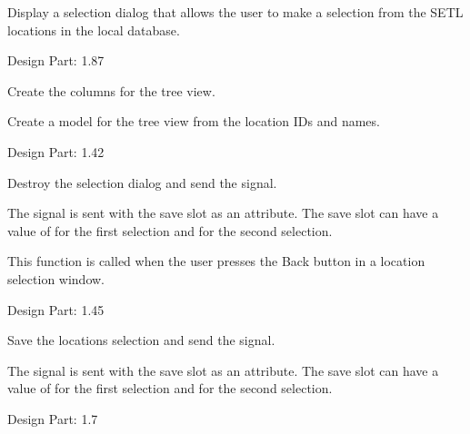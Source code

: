 \documentclass[letterpaper,10pt,english]{sphinxmanual}
\begin{document}
\begin{fulllineitems}
\label{setlyze/gui:setlyze.gui.SelectLocations}
Display a selection dialog that allows the user to make a
selection from the SETL locations in the local database.

Design Part: 1.87

\begin{fulllineitems}
\label{setlyze/gui:setlyze.gui.SelectLocations.create_columns}
Create the columns for the tree view.

\end{fulllineitems}


\begin{fulllineitems}
\label{setlyze/gui:setlyze.gui.SelectLocations.create_model}
Create a model for the tree view from the location IDs and
names.

Design Part: 1.42

\end{fulllineitems}


\begin{fulllineitems}
\label{setlyze/gui:setlyze.gui.SelectLocations.on_back}
Destroy the selection dialog and send the
 signal.

The  signal is sent with the save slot
as an attribute. The save slot can have a value of  for the
first selection and  for the second selection.

This function is called when the user presses the Back button in
a location selection window.

Design Part: 1.45

\end{fulllineitems}


\begin{fulllineitems}
\label{setlyze/gui:setlyze.gui.SelectLocations.save_selection}
Save the locations selection and send the
 signal.

The  signal is sent with the save slot
as an attribute. The save slot can have a value of  for the
first selection and  for the second selection.

Design Part: 1.7

\end{fulllineitems}


\end{fulllineitems}
\end{document}
